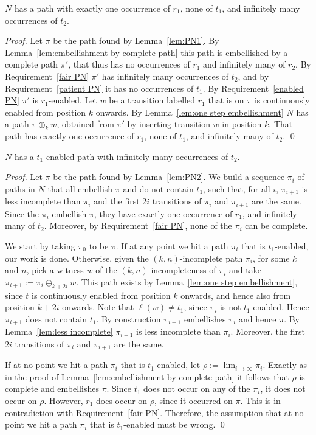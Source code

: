 \documentclass[smallcondensed]{svjour3}
\newcommand{\Lem}[1]{Lemma~\ref{lem:#1}}
\begin{document}
\begin{lemma}\label{lem:PN2}
  $N$ has a path with exactly one occurrence of $r_1$, none of $t_1$, and infinitely many occurrences of $t_2$.
\end{lemma}
\begin{proof}
Let $\pi$ be the path found by \Lem{PN1}.
By \Lem{embellishment by complete path} this path is embellished by a complete path $\pi'$,
that thus has no occurrences of $r_1$ and infinitely many of $r_2$.
By Requirement~\ref{fair PN} $\pi'$ has infinitely many occurrences of $t_2$,
and by Requirement~\ref{patient PN} it has no occurrences of $t_1$.
By Requirement~\ref{enabled PN} $\pi'$ is $r_1$-enabled.
Let $w$ be a transition labelled $r_1$ that is on $\pi$ is continuously enabled from position $k$ onwards.
By \Lem{one step embellishment} $N$ has a path $\pi\oplus_k w$, obtained from $\pi'$ by inserting
transition $w$ in position $k$. That path has exactly one occurrence of $r_1$, none of $t_1$, and infinitely many of $t_2$.
\qed
\end{proof}

\begin{lemma}\label{lem:PN3}
  $N$ has a $t_1$-enabled path with infinitely many occurrences of $t_2$.
\end{lemma}

\begin{proof}
Let $\pi$ be the path found by \Lem{PN2}.
We build a sequence $\pi_i$ of paths in $N$ that all embellish $\pi$ and do not contain $t_1$, such that, for all $i$,
$\pi_{i+1}$ is less incomplete than $\pi_i$ and the first $2i$ transitions of $\pi_i$ and $\pi_{i+\!1}$ are the same.
Since the $\pi_i$ embellish $\pi$, they have exactly one occurrence of $r_1$, and infinitely many of $t_2$.
Moreover, by Requirement~\ref{fair PN}, none of the $\pi_i$ can be complete.

We start by taking $\pi_0$ to be $\pi$.
If at any point we hit a path $\pi_i$ that is $t_1$-enabled, our work is done.
Otherwise, given the $(k,n)$-incomplete path $\pi_i$, for some $k$ and $n$,
pick a witness $w$ of the $(k,n)$-incompleteness of $\pi_i$ and take $\pi_{i+1} \mathbin{:=} \pi_i\oplus_{k+2i}w$.
This path exists by \Lem{one step embellishment}, since $t$ is continuously enabled from position
$k$ onwards, and hence also from position $k+2i$ onwards.
Note that $\ell(w)\neq t_1$, since $\pi_i$ is not $t_1$-enabled.
Hence $\pi_{i+1}$ does not contain $t_1$.
By construction $\pi_{i+1}$ embellishes $\pi_i$ and hence $\pi$.
By \Lem{less incomplete} $\pi_{i+1}$ is less incomplete than $\pi_i$.
Moreover, the first $2i$ transitions of $\pi_i$ and $\pi_{i+\!1}$ are the same.

If at no point we hit a path $\pi_i$ that is $t_1$-enabled, let $\rho:=\lim_{i\rightarrow\infty}\pi_i$.
Exactly as in the proof of \Lem{embellishment by complete path} it follows that
$\rho$ is complete and embellishes $\pi$. Since $t_1$ does not occur on any of the $\pi_i$, it does
not occur on $\rho$. However, $r_1$ does occur on $\rho$, since it occurred on $\pi$.
This is in contradiction with Requirement~\ref{fair PN}.
Therefore, the assumption that at no point we hit a path $\pi_i$ that is $t_1$-enabled must be wrong.
\qed
\end{proof}
\end{document}
